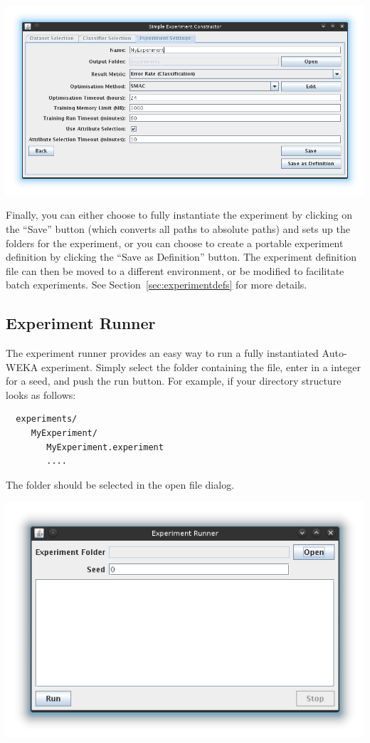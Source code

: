 \begin{center}
  \includegraphics[scale=0.7]{guiscreens/builder-experiment.png}
\end{center}

Finally, you can either choose to fully instantiate the experiment by clicking on the ``Save'' button (which converts all paths to absolute paths) and sets up the folders for the experiment,  or you can choose to create a portable experiment definition by clicking the ``Save as Definition'' button. The experiment definition file can then be moved to a different environment,  or be modified to facilitate batch experiments. See Section~\ref{sec:experimentdefs} for more details.

\subsection{Experiment Runner}

The experiment runner provides an easy way to run a fully instantiated Auto-WEKA experiment. Simply select the folder containing the  file, enter in a integer for a seed, and push the run button. For example, if your directory structure looks as follows:
\begin{verbatim}
  experiments/
     MyExperiment/
        MyExperiment.experiment
        ....
\end{verbatim}
The folder  should be selected in the open file dialog.

\begin{center}
  \includegraphics[scale=0.7]{guiscreens/runner.png}
\end{center}

